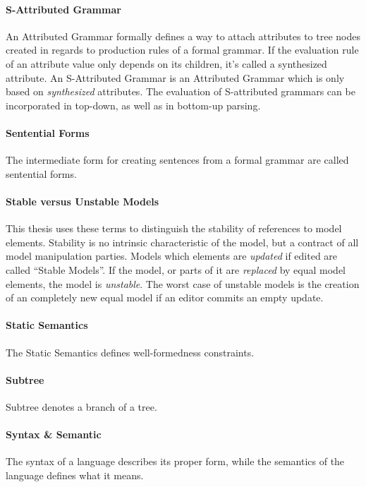 \paragraph{S-Attributed Grammar} 
An Attributed Grammar formally defines a way to attach attributes to tree nodes created in regards to production rules of a formal grammar. If the evaluation rule of an attribute value only depends on its children, it's called a synthesized attribute. An S-Attributed Grammar is an Attributed Grammar which is only based on \emph{synthesized} attributes. The evaluation of S-attributed grammars can be incorporated in top-down, as well as in bottom-up parsing. \cite{ParserBook}

\paragraph{Sentential Forms}   
The intermediate form for creating sentences from a formal grammar are called sentential forms. \cite{ParserBook}

\paragraph{Stable versus Unstable Models}
This thesis uses these terms to distinguish the stability of references to model elements. Stability is no intrinsic characteristic of the model, but a contract of all model manipulation parties. Models which elements are \emph{updated} if edited are called ``Stable Models''. If the model, or parts of it are \emph{replaced} by equal model elements, the model is \emph{unstable}. The worst case of unstable models is the creation of an completely new equal model if an editor commits an empty update.

\paragraph{Static Semantics} The Static Semantics defines well-formedness constraints. \cite{MDSD}

\paragraph{Subtree} Subtree denotes a branch of a tree.

\paragraph{Syntax \& Semantic}  
The syntax of a language describes its proper form, while the semantics of the language defines what it means. \cite{DragonBook}

